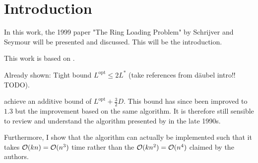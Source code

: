 \section{Introduction}

In this work, the 1999 paper "The Ring Loading Problem" by Schrijver and Seymour will be presented and discussed.
This will be the introduction.

This work is based on \citet{schrijver99}.

Already shown: Tight bound $L^\mathrm{opt} \leq 2 L^\ast$ (take references from däubel intro!! TODO).

\citet{schrijver99} achieve an additive bound of $L^\mathrm{opt} + \frac{3}{2}D$.
This bound has since been improved to $1.3$ but the improvement based on the same algorithm.
It is therefore still sensible to review and understand the algorithm presented by \citet{schrijver99} in the late 1990s.


Furthermore, I show that the algorithm can actually be implemented such that it takes $\mathcal{O}(kn) = \mathcal{O}(n^3)$ time rather than the $\mathcal{O}(kn^2) = \mathcal{O}(n^4)$ claimed by the authors.